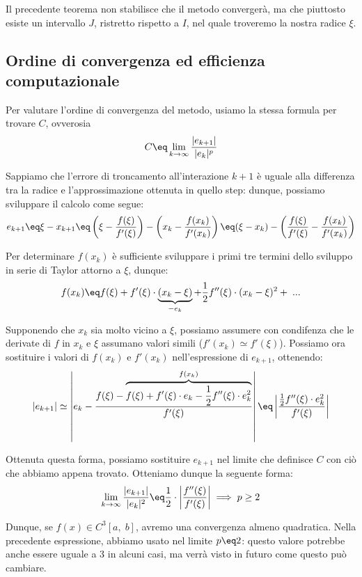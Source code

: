 Il precedente teorema non stabilisce che il metodo convergerà, ma che piuttosto esiste un intervallo $J$, ristretto rispetto a $I$, nel quale troveremo la nostra radice $\xi$.

\subsection{Ordine di convergenza ed efficienza computazionale}

Per valutare l'ordine di convergenza del metodo, usiamo la stessa formula per trovare $C$, ovverosia
\[ C \eq \lim_{k \to \infty} \frac{|e_{k + 1}|}{|e_k|^p} \]

Sappiamo che l'errore di troncamento all'interazione $k + 1$ è uguale alla differenza tra la radice e l'approssimazione ottenuta in quello step: dunque, possiamo sviluppare il calcolo come segue:
\[ e_{k + 1} \eq \xi - x_{k + 1} \eq \left(\xi - \frac{f(\xi)}{f'(\xi)}\right) - \left(x_k - \frac{f(x_k)}{f'(x_k)}\right) \eq (\xi - x_k) - \left(\frac{f(\xi)}{f'(\xi)} - \frac{f(x_k)}{f'(x_k)}\right) \]

Per determinare $f(x_k)$ è sufficiente sviluppare i primi tre termini dello sviluppo in serie di Taylor attorno a $\xi$, dunque:
\[ f(x_k) \eq f(\xi) + f'(\xi) \cdot \underbrace{(x_k - \xi)}_{-e_k} + \frac{1}{2} f''(\xi) \cdot (x_k - \xi)^2 + \; ... \]

Supponendo che $x_k$ sia molto vicino a $\xi$, possiamo assumere con condifenza che le derivate di $f$ in $x_k$ e $\xi$ assumano valori simili ($f'(x_k) \simeq f'(\xi)$). Possiamo ora sostituire i valori di $f(x_k)$ e $f'(x_k)$ nell'espressione di $e_{k + 1}$, ottenendo:
\[ |e_{k + 1}| \simeq \left\lvert e_k - \frac{f(\xi) - \overbrace{f(\xi) + f'(\xi) \cdot e_k - \frac{1}{2} f''(\xi) \cdot e_k^2}^{f(x_k)}}{f'(\xi)} \right\rvert \eq \left\lvert \frac{\frac{1}{2} f''(\xi) \cdot e_k^2}{f'(\xi)} \right\rvert \]

Ottenuta questa forma, possiamo sostituire $e_{k + 1}$ nel limite che definisce $C$ con ciò che abbiamo appena trovato. Otteniamo dunque la seguente forma:
\[ \lim_{k \to \infty} \frac{|e_{k + 1}|}{|e_k|^2} \eq \frac{1}{2} \cdot \left\lvert \frac{f''(\xi)}{f'(\xi)} \right\rvert \; \Longrightarrow \; p \geq 2 \]

Dunque, se $f(x) \in C^3 [a, \; b]$, avremo una convergenza almeno quadratica. Nella precedente espressione, abbiamo usato nel limite $p \eq 2$: questo valore potrebbe anche essere uguale a 3 in alcuni casi, ma verrà visto in futuro come questo può cambiare.
